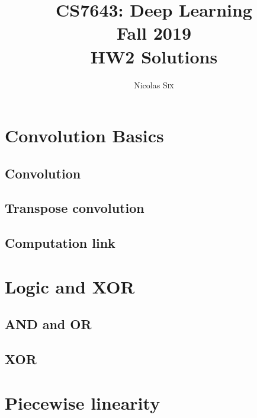 \documentclass[11pt,english]{article}
\begin{document}
    \title{CS7643: Deep Learning \\
    Fall 2019\\ HW2 Solutions}
    \author{Nicolas \textsc{Six}}
    \maketitle



    \section{Convolution Basics}

    \subsection{Convolution} \label{1.1}
    

    \pagebreak
    \subsection{Transpose convolution} \label{1.2}
    

    \pagebreak
    \subsection{Computation link} \label{1.3}
    

    \pagebreak
    \section{Logic and XOR}
    \subsection{AND and OR} \label{2.1}
    

    \pagebreak
    \subsection{XOR} \label{2.2}
    

    \pagebreak
    \section{Piecewise linearity}
\end{document}
